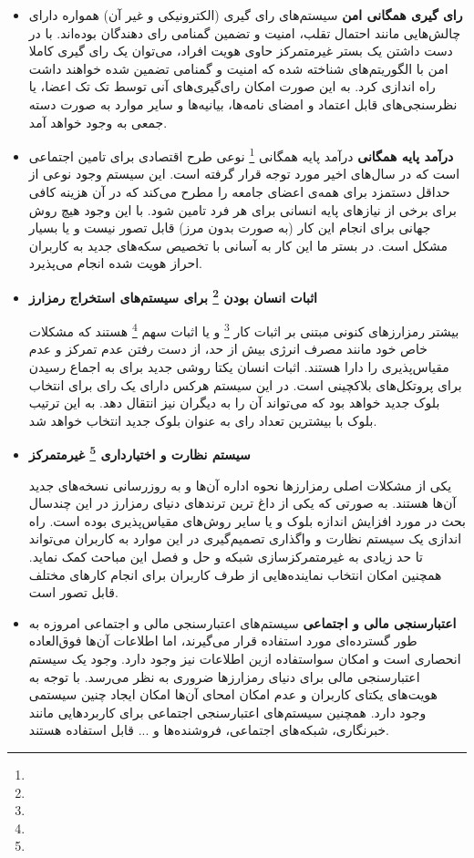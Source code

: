 \documentclass{article}
\begin{document}
\begin{itemize}

\item \textbf{رای گیری همگانی امن}
سیستم‌های رای گیری (الکترونیکی و غیر آن) همواره دارای چالش‌هایی مانند احتمال تقلب، امنیت و تضمین گمنامی رای دهندگان بوده‌اند. با در دست داشتن یک بستر غیرمتمرکز حاوی هویت افراد، می‌توان یک رای گیری کاملا امن با الگوریتم‌های  شناخته شده که امنیت و گمنامی تضمین شده خواهند داشت راه اندازی کرد. به این صورت امکان رای‌گیری‌های آنی توسط تک تک اعضا، یا نظرسنجی‌های قابل اعتماد و امضای نامه‌ها، بیانیه‌ها و سایر موارد به صورت دسته جمعی به وجود خواهد آمد. 

\item \textbf{ درآمد پایه همگانی}
درآمد پایه همگانی 
\footnote{}
نوعی طرح اقتصادی برای تامین اجتماعی است که در سال‌های اخیر مورد توجه قرار گرفته است. این سیستم وجود نوعی از حداقل دستمزد برای همه‌ی اعضای جامعه را مطرح می‌کند که در آن هزینه کافی برای برخی از نیازهای پایه انسانی برای هر فرد تامین شود. با این وجود هیچ روش جهانی برای انجام این کار (به صورت بدون مرز) قابل تصور نیست و یا بسیار مشکل است. در بستر ما این کار به آسانی با تخصیص سکه‌های جدید به کاربران احراز هویت شده انجام می‌پذیرد.

\item \textbf{ اثبات انسان بودن 
\footnote{}
 برای سیستم‌های استخراج رمزارز}

بیشتر رمزارزهای کنونی مبتنی بر اثبات کار 
\footnote{ }
و یا اثبات سهم
\footnote{ }
هستند که مشکلات خاص خود مانند مصرف انرژی بیش از حد، از دست رفتن عدم تمرکز و عدم مقیاس‌پذیری را دارا هستند. اثبات انسان یکتا روشی جدید برای به اجماع رسیدن برای پروتکل‌های بلاکچینی است. در این سیستم هرکس دارای یک رای برای انتخاب بلوک جدید خواهد بود که می‌تواند آن را به دیگران نیز انتقال دهد. به این ترتیب بلوک با بیشترین تعداد رای به عنوان بلوک جدید انتخاب خواهد شد.

\item \textbf{ سیستم نظارت و اختیارداری
\footnote{ }
 غیرمتمرکز}

یکی از مشکلات اصلی رمزارزها نحوه اداره آن‌ها و به روزرسانی نسخه‌های جدید آن‌ها هستند. به صورتی که یکی از داغ ترین ترند‌های دنیای رمزارز در این چندسال بحث در مورد افزایش اندازه بلوک و یا سایر روش‌های مقیاس‌پذیری بوده است. راه اندازی یک سیستم نظارت و واگذاری تصمیم‌گیری در این موارد به کاربران می‌تواند تا حد زیادی به غیرمتمرکزسازی شبکه و حل و فصل این مباحث کمک نماید.  همچنین امکان انتخاب نماینده‌هایی از طرف کاربران برای انجام کارهای مختلف قابل تصور است.

\item \textbf{ اعتبارسنجی مالی و اجتماعی}
سیستم‌های اعتبارسنجی مالی و اجتماعی امروزه به طور گسترده‌ای مورد استفاده قرار می‌گیرند، اما اطلاعات آن‌ها فوق‌العاده انحصاری است و امکان سواستفاده ازین اطلاعات نیز وجود دارد. وجود یک سیستم اعتبارسنجی مالی برای دنیای رمزارزها ضروری به نظر می‌رسد. با توجه به هویت‌های یکتای کاربران و عدم امکان امحای آن‌ها امکان ایجاد چنین سیستمی وجود دارد. همچنین سیستم‌های اعتبارسنجی اجتماعی برای کاربردهایی مانند خبرنگاری، شبکه‌های اجتماعی، فروشنده‌ها و ... قابل استفاده هستند.

\end{itemize}
\end{document}
